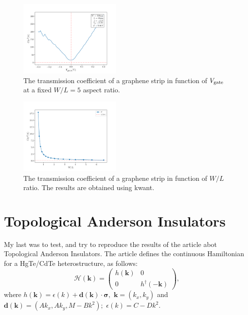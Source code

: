 \documentclass[11pt, a4paper, twocolumn]{article}
\newcommand{\bb}[1]{\mathbf{#1}}
\begin{document}
\begin{figure}[H]
  \begin{center}
  \includegraphics[width=0.45\textwidth]{./media/graphene_minimal_vg_l_0-3.png}
  \caption{The transmission coefficient of a graphene strip in function of $V_{\textnormal{gate}}$ at
  a fixed $W/L=5$ aspect ratio.}
  \label{fig:graphene_minimal_vg_l_0-3}
  \end{center}
\end{figure}

\begin{figure}[H]
  \begin{center}
  \includegraphics[width=0.45\textwidth]{./media/graphene_conductivity_WL.png}
  \caption{The transmission coefficient of a graphene strip in function of $W/L$ ratio. 
  The results are obtained using kwant.}
  \label{fig:graphene_conductivity_WL}
  \end{center}
\end{figure}

\section*{Topological Anderson Insulators}
My last was to test, and try to reproduce the results of the article \cite{andersoninsulator} abot 
Topological Anderson Insulators.
The article \cite{andersoninsulator} defines the continuous Hamiltonian for a HgTe/CdTe heterostructure,
as follows:
\begin{equation*}
  \mathcal H(\bb k) = \left(
    \begin{array}{cc}
      h(\bb k) & 0 \\
      0 & h^{\dagger}(-\bb k) 
    \end{array}
  \right) \text{,}
\end{equation*}
where 
$
  h(\bb k) = \epsilon(k) + \bb d (\bb k)\cdot\bb\sigma \textrm{, } \, \bb k = (k_x, k_y) 
$ 
and 
$
  \bb d(\bb k ) = (Ak_x, Ak_y, M-Bk^2) \textrm{; } \, \epsilon(k) = C-Dk^2
$.
\end{document}

